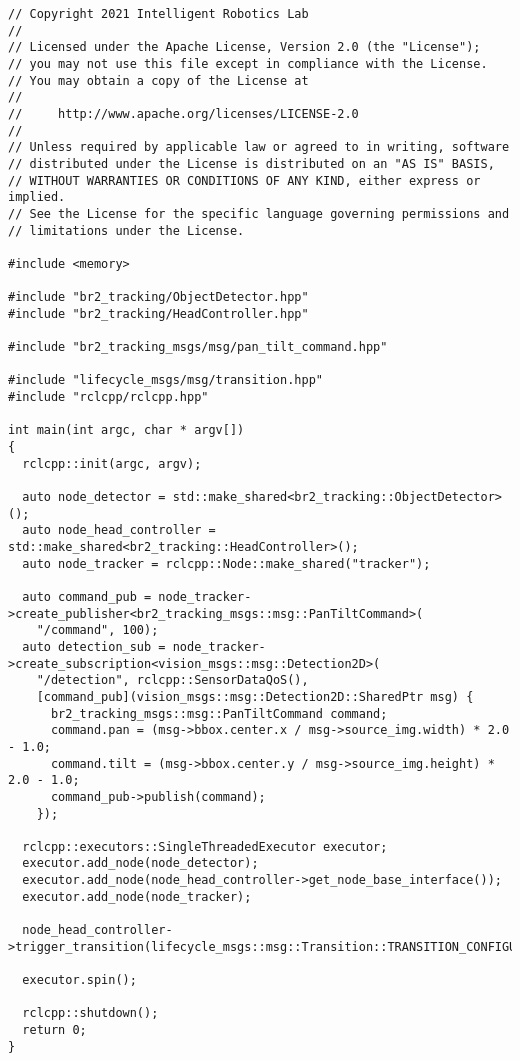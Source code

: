  \footnotesize
\begin{tcolorbox}[sharp corners, colframe=gray!80, colback=LightGray, left=0pt, top=0pt, bottom=0pt, title=\texttt{br2\_tracking/src/object\_tracker\_main.cpp}]
  \begin{verbatim}
// Copyright 2021 Intelligent Robotics Lab
//
// Licensed under the Apache License, Version 2.0 (the "License");
// you may not use this file except in compliance with the License.
// You may obtain a copy of the License at
//
//     http://www.apache.org/licenses/LICENSE-2.0
//
// Unless required by applicable law or agreed to in writing, software
// distributed under the License is distributed on an "AS IS" BASIS,
// WITHOUT WARRANTIES OR CONDITIONS OF ANY KIND, either express or implied.
// See the License for the specific language governing permissions and
// limitations under the License.

#include <memory>

#include "br2_tracking/ObjectDetector.hpp"
#include "br2_tracking/HeadController.hpp"

#include "br2_tracking_msgs/msg/pan_tilt_command.hpp"

#include "lifecycle_msgs/msg/transition.hpp"
#include "rclcpp/rclcpp.hpp"

int main(int argc, char * argv[])
{
  rclcpp::init(argc, argv);

  auto node_detector = std::make_shared<br2_tracking::ObjectDetector>();
  auto node_head_controller = std::make_shared<br2_tracking::HeadController>();
  auto node_tracker = rclcpp::Node::make_shared("tracker");

  auto command_pub = node_tracker->create_publisher<br2_tracking_msgs::msg::PanTiltCommand>(
    "/command", 100);
  auto detection_sub = node_tracker->create_subscription<vision_msgs::msg::Detection2D>(
    "/detection", rclcpp::SensorDataQoS(),
    [command_pub](vision_msgs::msg::Detection2D::SharedPtr msg) {
      br2_tracking_msgs::msg::PanTiltCommand command;
      command.pan = (msg->bbox.center.x / msg->source_img.width) * 2.0 - 1.0;
      command.tilt = (msg->bbox.center.y / msg->source_img.height) * 2.0 - 1.0;
      command_pub->publish(command);
    });

  rclcpp::executors::SingleThreadedExecutor executor;
  executor.add_node(node_detector);
  executor.add_node(node_head_controller->get_node_base_interface());
  executor.add_node(node_tracker);

  node_head_controller->trigger_transition(lifecycle_msgs::msg::Transition::TRANSITION_CONFIGURE);

  executor.spin();

  rclcpp::shutdown();
  return 0;
}
    \end{verbatim}
    \end{tcolorbox}
  \normalsize


